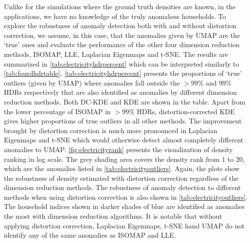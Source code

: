 \documentclass[11pt,a4paper,]{article}
\begin{document}
Unlike for the simulations where the ground truth densities are known, in the applications, we have no knowledge of the truly anomalous households. To explore the robustness of anomaly detection both with and without distortion correction, we assume, in this case, that the anomalies given by UMAP are the `true' ones and evaluate the performance of the other four dimension reduction methods, ISOMAP, LLE, Laplacian Eigenmaps and t-SNE. The results are summarized in \autoref{tab:electricityhdrpercent} which can be interpreted similarly to \autoref{tab:fourdhdrtable}. \autoref{tab:electricityhdrpercent} presents the proportions of `true' outliers (given by UMAP) where anomalies fall outside the \(>99\%\) and \(99\%\) HDRs respectively that are also identified as anomalies by different dimension reduction methods. Both DC-KDE and KDE are shown in the table. Apart from the lower percentage of ISOMAP in \(>99\%\) HDRs, distortion-corrected KDE gives higher proportions of true outliers in all other methods. The improvement brought by distortion correction is much more pronounced in Laplacian Eigenmaps and t-SNE which would otherwise detect almost completely different anomalies to UMAP. \autoref{fig:electricityrank} presents the visualization of density ranking in log scale. The grey shading area covers the density rank from 1 to 20, which are the anomalies listed in \autoref{tab:electricityoutliers}. Again, the plots show the robustness of density estimated with distortion correction regardless of the dimension reduction methods. The robustness of anomaly detection to different methods when using distortion correction is also shown in \autoref{tab:electricityoutliers}. The household indices shown in darker shades of blue are identified as anomalies the most with dimension reduction algorithms. It is notable that without applying distortion correction, Laplacian Eigenmaps, t-SNE hand UMAP do not identify any of the same anomalies as ISOMAP and LLE.
\end{document}
